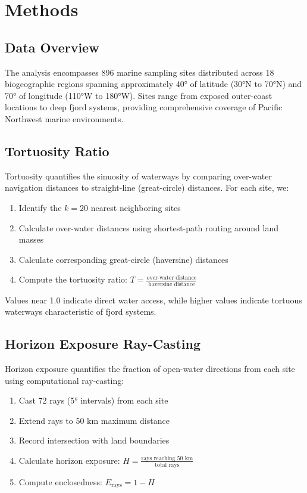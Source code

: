 \documentclass[11pt,a4paper]{article}
\begin{document}
\section{Methods}

\subsection{Data Overview}

The analysis encompasses 896 marine sampling sites distributed across 18 biogeographic regions spanning approximately 40° of latitude (30°N to 70°N) and 70° of longitude (110°W to 180°W). Sites range from exposed outer-coast locations to deep fjord systems, providing comprehensive coverage of Pacific Northwest marine environments.

\subsection{Tortuosity Ratio}

Tortuosity quantifies the sinuosity of waterways by comparing over-water navigation distances to straight-line (great-circle) distances. For each site, we:

\begin{enumerate}
    \item Identify the $k=20$ nearest neighboring sites
    \item Calculate over-water distances using shortest-path routing around land masses
    \item Calculate corresponding great-circle (haversine) distances
    \item Compute the tortuosity ratio: $T = \frac{\text{over-water distance}}{\text{haversine distance}}$
\end{enumerate}

Values near 1.0 indicate direct water access, while higher values indicate tortuous waterways characteristic of fjord systems.

\subsection{Horizon Exposure Ray-Casting}

Horizon exposure quantifies the fraction of open-water directions from each site using computational ray-casting:

\begin{enumerate}
    \item Cast 72 rays (5° intervals) from each site
    \item Extend rays to 50 km maximum distance
    \item Record intersection with land boundaries
    \item Calculate horizon exposure: $H = \frac{\text{rays reaching 50 km}}{\text{total rays}}$
    \item Compute enclosedness: $E_{\text{rays}} = 1 - H$
\end{enumerate}
\end{document}
